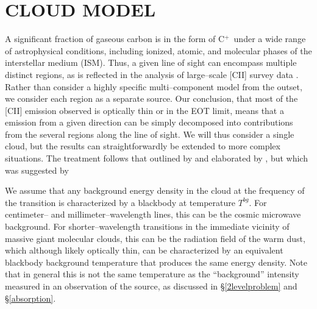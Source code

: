 \documentclass[12pt]{aastex}
\def \cp{C$^+$}
\def \C2{C{\sc II}}
\def \H1{{\sc HI}}
\def\tb{$T^{bg}$}
\begin{document}
\section{CLOUD MODEL}
\label{model}

A significant fraction of gaseous carbon is in the form of \cp\ under a wide range of astrophysical conditions, including ionized, atomic, and molecular phases of the interstellar medium (ISM).  
Thus, a given line of sight can encompass multiple distinct regions, as is reflected in the analysis of large--scale [\C2] survey data \citep[e.g.][]{langer2010}.
Rather than consider a highly specific multi--component model from the outset, we consider each region as a separate source. 
Our conclusion, that most of the [\C2] emission observed is optically thin or in the EOT limit, means that a emission from a given direction can be simply decomposed into contributions from the several regions along the line of sight.  
We will thus consider a single cloud, but the results can straightforwardly be extended to more complex situations.
The treatment follows that outlined by \cite{penzias1975} and elaborated by \cite{linke1977}, but which was suggested by \cite{goldreich1974}

We assume that any background energy density in the cloud at the frequency of the transition is characterized by a blackbody at temperature \tb.  
For centimeter-- and millimeter--wavelength lines, this can be the cosmic microwave background.  
For shorter--wavelength transitions in the immediate vicinity of massive giant molecular clouds, this can be the radiation field of the warm dust, which although likely optically thin, can be characterized by an equivalent blackbody background temperature that produces the same energy density.
Note that in general this is not the same temperature as the ``background'' intensity measured in an observation of the source, as discussed in \S \ref{2levelproblem} and \S \ref{absorption}.

\end{document}
